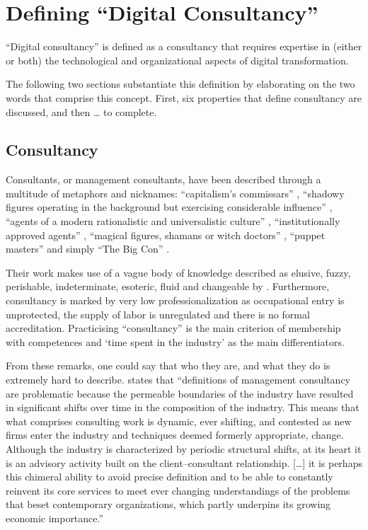 \documentclass[12pt]{article}
\begin{document}
\hypertarget{defining-digital-consultancy}{%
\section{Defining ``Digital
Consultancy''}\label{defining-digital-consultancy}}

``Digital consultancy'' is defined as a consultancy that requires
expertise in (either or both) the technological and organizational
aspects of digital transformation.

The following two sections substantiate this definition by elaborating
on the two words that comprise this concept. First, six properties that
define consultancy are discussed, and then \ldots{} to complete.

\hypertarget{consultancy}{%
\subsection{Consultancy}\label{consultancy}}

Consultants, or management consultants, have been described through a
multitude of metaphors and nicknames: ``capitalism's commissars''
\citep[ 93]{thrift2005}, ``shadowy figures operating in the background
but exercising considerable influence'' \citep[ 31]{kipping2012},
``agents of a modern rationalistic and universalistic culture'' \citep[
190]{kipping2012}, ``institutionally approved agents'' \citep[
193]{kipping2012}, ``magical figures, shamans or witch doctors'' \citep[
68]{fincham2002}, ``puppet masters'' \citep[ 69]{fincham2002} and simply
``The Big Con'' \citep{mazzucato2023}.

Their work makes use of a vague body of knowledge described as elusive,
fuzzy, perishable, indeterminate, esoteric, fluid and changeable by
\citet{muzio2011}. Furthermore, consultancy is marked by very low
professionalization as occupational entry is unprotected, the supply of
labor is unregulated and there is no formal accreditation. \citep[
20]{fincham2006} Practicising ``consultancy'' is the main criterion of
membership with competences and `time spent in the industry' as the main
differentiators.

From these remarks, one could say that who they are, and what they do is
extremely hard to describe. \citet[24]{kipping2012} states that
``definitions of management consultancy are problematic because the
permeable boundaries of the industry have resulted in significant shifts
over time in the composition of the industry. This means that what
comprises consulting work is dynamic, ever shifting, and contested as
new firms enter the industry and techniques deemed formerly appropriate,
change. Although the industry is characterized by periodic structural
shifts, at its heart it is an advisory activity built on the
client--consultant relationship. {[}\ldots{]} it is perhaps this
chimeral ability to avoid precise definition and to be able to
constantly reinvent its core services to meet ever changing
understandings of the problems that beset contemporary organizations,
which partly underpins its growing economic importance.''
\end{document}
